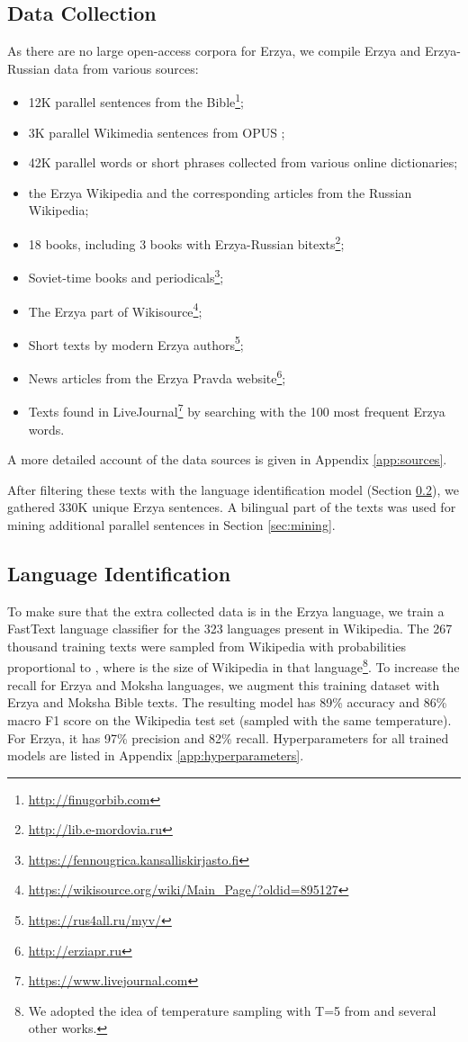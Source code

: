 \documentclass[11pt]{article}
\begin{document}
\subsection{Data Collection}
As there are no large open-access corpora for Erzya, we compile Erzya and Erzya-Russian data from various sources:
\begin{itemize}
    \item  12K parallel sentences from the Bible\footnote{\url{http://finugorbib.com}};
    \item 3K parallel Wikimedia sentences from OPUS \cite{tiedemann-2012-parallel};
    \item 42K parallel words or short phrases collected from various online dictionaries;
    \item the Erzya Wikipedia and the corresponding articles from the Russian Wikipedia;
    \item 18 books, including 3 books with Erzya-Russian bitexts\footnote{\url{http://lib.e-mordovia.ru}};
    \item Soviet-time books and periodicals\footnote{\url{https://fennougrica.kansalliskirjasto.fi}};
    \item The Erzya part of Wikisource\footnote{\url{https://wikisource.org/wiki/Main\_Page/?oldid=895127}};
    \item Short texts by modern Erzya authors\footnote{\url{https://rus4all.ru/myv/}};
    \item News articles from the Erzya Pravda website\footnote{\url{http://erziapr.ru}};
    \item Texts found in LiveJournal\footnote{\url{https://www.livejournal.com}} by searching with the 100 most frequent Erzya words.
\end{itemize}
A more detailed account of the data sources is given in Appendix \ref{app:sources}.

After filtering these texts with the language identification model (Section \ref{sec:langid}), we gathered 330K unique Erzya sentences. A bilingual part of the texts was used for mining additional parallel sentences in Section \ref{sec:mining}.

\subsection{Language Identification}
\label{sec:langid}
To make sure that the extra collected data is in the Erzya language, we train a FastText \cite{joulin2016bag} language classifier for the 323 languages present in Wikipedia. The 267 thousand training texts were sampled from Wikipedia with probabilities proportional to , where  is the size of Wikipedia in that language\footnote{We adopted the idea of temperature sampling
with T=5 from \citet{tran-etal-2021-facebook} and several other works.}. To increase the recall for Erzya and Moksha languages, we augment this training dataset with Erzya and Moksha Bible texts. The resulting model 
has 89\% accuracy and 86\% macro F1 score on the Wikipedia test set (sampled with the same temperature). For Erzya, it has 97\% precision and 82\% recall. Hyperparameters for all trained models are listed in Appendix \ref{app:hyperparameters}.
\end{document}
